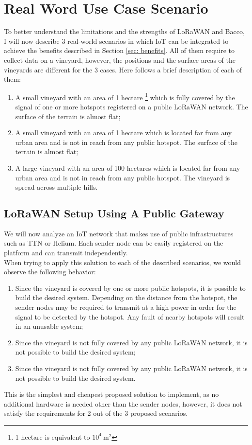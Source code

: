 \section{Real Word Use Case Scenario}
To better understand the limitations and the strengths of LoRaWAN and Bacco, I will now describe 3 real-world scenarios
in which \gls{IoT} can be integrated to achieve the benefits described in Section \ref{sec: benefits}. All of them
require to collect data on a vineyard, however, the positions and the surface areas of the vineyards are
different for the 3 cases. Here follows a brief description of each of them:
\begin{enumerate}
    \item A small vineyard with an area of 1 hectare \footnote{1 hectare is equivalent to $10^4~\mathrm{m^2}$} which is
        fully covered by the signal of one or more hotspots registered on a public LoRaWAN
        network. The surface of the terrain is almost flat;
    \item A small vineyard with an area of 1 hectare which is located far from any urban area and is not
        in reach from any public hotspot. The surface of the terrain is almost flat;
    \item A large vineyard with an area of 100 hectares which is located far from any urban area and is not in reach
        from any public hotspot. The vineyard is spread across multiple hills.
\end{enumerate}

\subsection{LoRaWAN Setup Using A Public Gateway}
We will now analyze an \gls{IoT} network that makes use of public infrastructures such as
\gls{TTN} or Helium. Each sender node can be easily registered on the platform and can transmit independently.\\
When trying to apply this solution to each of the described scenarios, we would observe the following behavior:
\begin{enumerate}
    \item Since the vineyard is covered by one or more public hotspots, it is possible to build the desired system.
        Depending on the distance from the hotspot, the sender nodes may be required to transmit at a high power in
        order for the signal to be detected by the hotspot. Any fault of nearby hotspots will result in an unusable
        system;
    \item Since the vineyard is not fully covered by any public LoRaWAN network, it is not possible to build the desired
        system;
    \item Since the vineyard is not fully covered by any public LoRaWAN network, it is not possible to build the desired
        system.
\end{enumerate}
This is the simplest and cheapest proposed solution to implement, as no additional hardware is needed other than the
sender nodes, however, it does not satisfy the requirements for 2 out of the 3 proposed scenarios.

